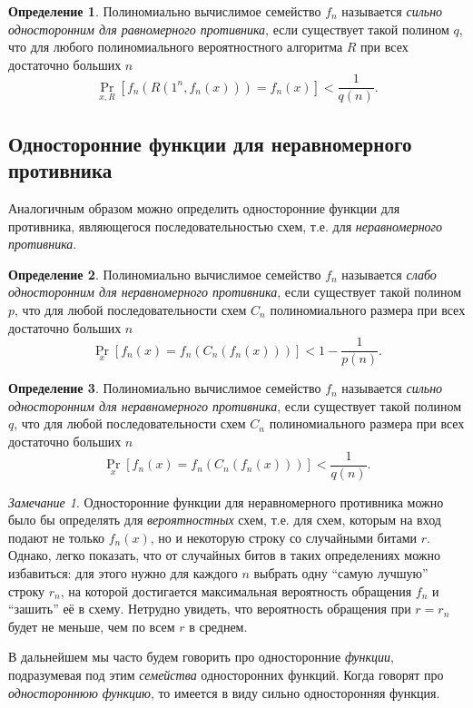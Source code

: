 \documentclass[12pt]{article}
\theoremstyle{definition}
\newtheorem{definition}{Определение}[section]
\theoremstyle{plain}
\theoremstyle{remark}
\newtheorem{remark}{Замечание}[section]
\begin{document}
\begin{definition}
    Полиномиально вычислимое семейство $f_n$ называется 
    \emph{сильно односторонним для равномерного противника}, 
    если существует такой полином $q$, что
    для любого полиномиального вероятностного алгоритма $R$ 
    при всех достаточно больших $n$
    $$\Pr_{x,R}[f_n(R(1^n, f_n(x))) = f_n(x)] < \frac{1}{q(n)}.$$
\end{definition}

\subsection{Односторонние функции для неравномерного противника}
Аналогичным образом можно определить односторонние функции для противника, 
являющегося последовательностью схем, т.е. для \emph{неравномерного противника}.
\begin{definition}
    Полиномиально вычислимое семейство $f_n$ называется
    \emph{слабо односторонним для неравномерного противника}, 
    если существует такой полином $p$, 
    что для любой последовательности схем $C_n$ полиномиального размера
    при всех достаточно больших $n$
        $$\Pr_{x}[f_n(x) = f_n(C_n(f_n(x)))] < 1 - \frac{1}{p(n)}.$$
\end{definition}

\begin{definition}
    Полиномиально вычислимое семейство $f_n$ называется
    \emph{сильно односторонним для неравномерного противника}, 
    если существует такой полином $q$, 
    что для любой последовательности схем $C_n$ полиномиального размера
    при всех достаточно больших $n$
        $$\Pr_{x}[f_n(x) = f_n(C_n(f_n(x)))] < \frac{1}{q(n)}.$$
\end{definition}

\begin{remark}
Односторонние функции для неравномерного противника можно было бы 
определять для \emph{вероятностных} схем, т.е. для схем, которым на вход
подают не только $f_n(x)$, но и некоторую строку со случайными битами $r$.
Однако, легко показать, что от случайных битов в таких определениях
можно избавиться: для этого нужно для каждого $n$ выбрать одну ``самую лучшую''
строку $r_n$, на которой достигается максимальная вероятность обращения $f_n$
и ``зашить'' её в схему. Нетрудно увидеть, что вероятность обращения при 
$r = r_n$ будет не меньше, чем по всем $r$ в среднем.
\end{remark}

В дальнейшем мы часто будем говорить про односторонние \emph{функции}, 
подразумевая под этим \emph{семейства} односторонних функций. 
Когда говорят про \emph{одностороннюю функцию}, то имеется 
в виду сильно односторонняя функция.
\end{document}
